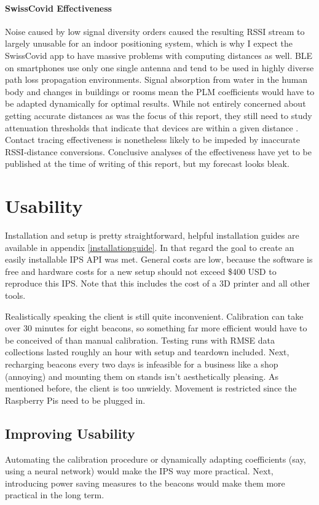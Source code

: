 \documentclass[a4paper, oneside]{ipsreport}
\begin{document}
\paragraph{SwissCovid Effectiveness}
Noise caused by low signal diversity orders caused the resulting RSSI stream to largely unusable for an indoor positioning system, which is why I expect the SwissCovid app to have massive problems with computing distances as well. BLE on smartphones use only one single antenna and tend to be used in highly diverse path loss propagation environments. Signal absorption from water in the human body and changes in buildings or rooms mean the PLM coefficients would have to be adapted dynamically for optimal results. While not entirely concerned about getting accurate distances as was the focus of this report, they still need to study attenuation thresholds that indicate that devices are within a given distance \cite{SwissCovid, SwissCovidGithub}. Contact tracing effectiveness is nonetheless likely to be impeded by inaccurate RSSI-distance conversions. Conclusive analyses of the effectiveness have yet to be published at the time of writing of this report, but my forecast looks bleak.

\section{Usability}
Installation and setup is pretty straightforward, helpful installation guides are available in appendix \ref{installationguide}. In that regard the goal to create an easily installable IPS API was met. General costs are low, because the software is free and hardware costs for a new setup should not exceed \$400 USD to reproduce this IPS. Note that this includes the cost of a 3D printer and all other tools.

Realistically speaking the client is still quite inconvenient. Calibration can take over 30 minutes for eight beacons, so something far more efficient would have to be conceived of than manual calibration. Testing runs with RMSE data collections lasted roughly an hour with setup and teardown included. Next, recharging beacons every two days is infeasible for a business like a shop (annoying) and mounting them on stands isn't aesthetically pleasing. As mentioned before, the client is too unwieldy. Movement is restricted since the Raspberry Pis need to be plugged in.

\subsection{Improving Usability}
Automating the calibration procedure or dynamically adapting coefficients (say, using a neural network) would make the IPS way more practical. Next, introducing power saving measures to the beacons would make them more practical in the long term.
\end{document}
